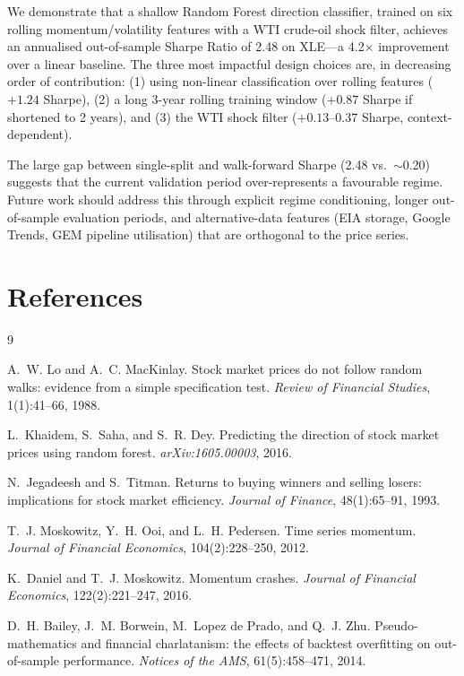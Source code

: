 \documentclass{article}
\begin{document}
We demonstrate that a shallow Random Forest direction classifier, trained on six
rolling momentum/volatility features with a WTI crude-oil shock filter, achieves
an annualised out-of-sample Sharpe Ratio of 2.48 on XLE---a 4.2$\times$ improvement
over a linear baseline.
The three most impactful design choices are, in decreasing order of contribution:
(1) using non-linear classification over rolling features ($+1.24$ Sharpe),
(2) a long 3-year rolling training window ($+0.87$ Sharpe if shortened to 2 years),
and (3) the WTI shock filter ($+0.13$--$0.37$ Sharpe, context-dependent).

The large gap between single-split and walk-forward Sharpe (2.48 vs.\ $\sim$0.20)
suggests that the current validation period over-represents a favourable regime.
Future work should address this through explicit regime conditioning, longer
out-of-sample evaluation periods, and alternative-data features (EIA storage,
Google Trends, GEM pipeline utilisation) that are orthogonal to the price series.

\section*{References}

\begingroup
\renewcommand{\section}[2]{}
\begin{thebibliography}{9}

A.~W. Lo and A.~C. MacKinlay.
\newblock Stock market prices do not follow random walks: evidence from a simple specification test.
\newblock \textit{Review of Financial Studies}, 1(1):41--66, 1988.

L.~Khaidem, S.~Saha, and S.~R. Dey.
\newblock Predicting the direction of stock market prices using random forest.
\newblock \textit{arXiv:1605.00003}, 2016.

N.~Jegadeesh and S.~Titman.
\newblock Returns to buying winners and selling losers: implications for stock market efficiency.
\newblock \textit{Journal of Finance}, 48(1):65--91, 1993.

T.~J. Moskowitz, Y.~H. Ooi, and L.~H. Pedersen.
\newblock Time series momentum.
\newblock \textit{Journal of Financial Economics}, 104(2):228--250, 2012.

K.~Daniel and T.~J. Moskowitz.
\newblock Momentum crashes.
\newblock \textit{Journal of Financial Economics}, 122(2):221--247, 2016.

D.~H. Bailey, J.~M. Borwein, M.~Lopez de Prado, and Q.~J. Zhu.
\newblock Pseudo-mathematics and financial charlatanism: the effects of backtest overfitting
on out-of-sample performance.
\newblock \textit{Notices of the AMS}, 61(5):458--471, 2014.

\end{thebibliography}
\endgroup
\end{document}

